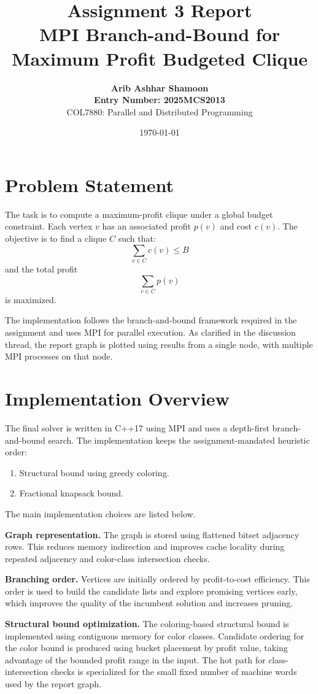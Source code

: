 \documentclass[11pt,a4paper]{article}
\title{\textbf{Assignment 3 Report}\\MPI Branch-and-Bound for Maximum Profit Budgeted Clique}
\author{
    \textbf{Arib Ashhar Shamoon} \\
    \textbf{Entry Number: 2025MCS2013} \\
    COL7880: Parallel and Distributed Programming
}
\date{\today}
\begin{document}
\maketitle

\section{Problem Statement}
The task is to compute a maximum-profit clique under a global budget constraint. Each vertex $v$ has an associated profit $p(v)$ and cost $c(v)$. The objective is to find a clique $C$ such that:
\[
\sum_{v \in C} c(v) \leq B
\]
and the total profit
\[
\sum_{v \in C} p(v)
\]
is maximized.

The implementation follows the branch-and-bound framework required in the assignment and uses MPI for parallel execution. As clarified in the discussion thread, the report graph is plotted using results from a single node, with multiple MPI processes on that node.

\section{Implementation Overview}
The final solver is written in C++17 using MPI and uses a depth-first branch-and-bound search. The implementation keeps the assignment-mandated heuristic order:
\begin{enumerate}
    \item Structural bound using greedy coloring.
    \item Fractional knapsack bound.
\end{enumerate}

The main implementation choices are listed below.

\textbf{Graph representation.}
The graph is stored using flattened bitset adjacency rows. This reduces memory indirection and improves cache locality during repeated adjacency and color-class intersection checks.

\textbf{Branching order.}
Vertices are initially ordered by profit-to-cost efficiency. This order is used to build the candidate lists and explore promising vertices early, which improves the quality of the incumbent solution and increases pruning.

\textbf{Structural bound optimization.}
The coloring-based structural bound is implemented using contiguous memory for color classes. Candidate ordering for the color bound is produced using bucket placement by profit value, taking advantage of the bounded profit range in the input. The hot path for class-intersection checks is specialized for the small fixed number of machine words used by the report graph.
\end{document}
